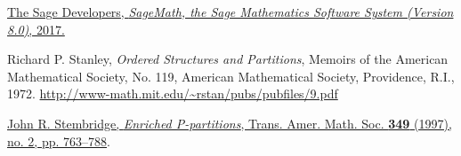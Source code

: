 \documentclass[numbers=enddot,12pt,final,onecolumn,notitlepage]{scrartcl}%
\theoremstyle{definition}
\begin{document}
\begin{thebibliography}{99999999}
\href{http://www.sagemath.org}{The Sage
Developers, \textit{SageMath, the Sage Mathematics Software System (Version
8.0)}, 2017.}

Richard P. Stanley, \textit{Ordered Structures and
Partitions}, Memoirs of the American Mathematical Society, No. 119, American
Mathematical Society, Providence, R.I., 1972. \newline\url{http://www-math.mit.edu/~rstan/pubs/pubfiles/9.pdf}

%
\href{http://www.ams.org/journals/tran/1997-349-02/S0002-9947-97-01804-7/}{John
R. Stembridge, \textit{Enriched P-partitions}, Trans. Amer. Math. Soc.
\textbf{349} (1997), no. 2, pp. 763--788}.
\end{thebibliography}
\end{document}
